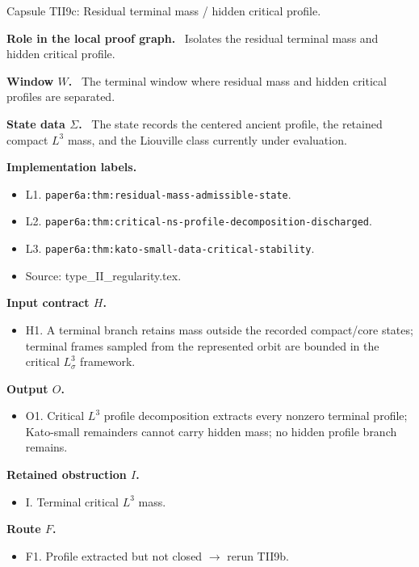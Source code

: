 \documentclass[11pt]{amsart}
\newcommand{\capsulefield}[1]{\par\smallskip\noindent\textbf{#1.}\ }
\begin{document}
\begin{proofcapsule}{Capsule TII9c: Residual terminal mass / hidden critical profile.}
  \capsulefield{Role in the local proof graph}
  Isolates the residual terminal mass and hidden critical profile.

  \capsulefield{Window \(W\)}
The terminal window where residual mass and hidden critical profiles are separated.

  \capsulefield{State data \(\Sigma\)}
The state records the centered ancient profile, the retained compact $L^3$ mass, and the Liouville class currently under evaluation.

  \capsulefield{Implementation labels}
  \begin{itemize}[leftmargin=1.8em]
  \item L1. \texttt{paper6a:thm:residual-mass-admissible-state}.
  \item L2. \texttt{paper6a:thm:critical-ns-profile-decomposition-discharged}.
  \item L3. \texttt{paper6a:thm:kato-small-data-critical-stability}.
  \item Source: type\_II\_regularity.tex.
  \end{itemize}

  \capsulefield{Input contract \(H\)}
  \begin{itemize}[leftmargin=1.8em]
  \item H1. A terminal branch retains mass outside the recorded compact/core states; terminal frames sampled from the represented orbit are bounded in the critical \(L^3_\sigma\) framework.
  \end{itemize}

  \capsulefield{Output \(O\)}
  \begin{itemize}[leftmargin=1.8em]
  \item O1. Critical $L^3$ profile decomposition extracts every nonzero terminal profile; Kato-small remainders cannot carry hidden mass; no hidden profile branch remains.
  \end{itemize}

  \capsulefield{Retained obstruction \(I\)}
  \begin{itemize}[leftmargin=1.8em]
  \item I. Terminal critical $L^3$ mass.
  \end{itemize}

  \capsulefield{Route \(F\)}
  \begin{itemize}[leftmargin=1.8em]
  \item F1. Profile extracted but not closed $\to$ rerun TII9b.
  \end{itemize}


\end{proofcapsule}
\end{document}
